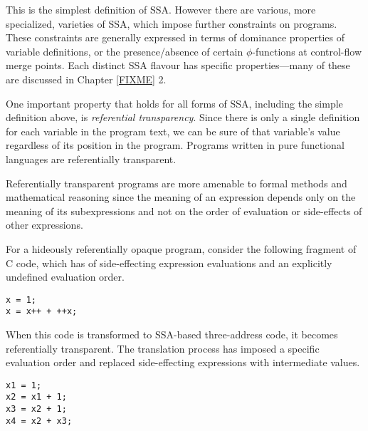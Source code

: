 This is the simplest definition of SSA. However
there are various, more specialized, varieties of SSA,
which impose further constraints on programs.
These constraints are generally expressed in terms
of dominance properties of variable definitions, or
the presence/absence of certain 
$\phi$-functions at control-flow merge points.
Each distinct SSA flavour has specific properties---many of
these are discussed in Chapter \ref{FIXME} 2.

One important property that holds for all forms of SSA,
including the simple definition above, is 
\emph{referential transparency}.
Since there is only a single definition for each variable
in the program text, we can be sure of that variable's value
regardless of its position in the program.
Programs written in pure functional languages
are referentially transparent.

Referentially transparent programs are more amenable to 
formal methods and mathematical reasoning since
the meaning of an expression depends only on the
meaning of its subexpressions
and not on the order of evaluation or
side-effects of other expressions.

For a hideously referentially opaque program, consider
the following fragment of C code, which has of side-effecting
expression evaluations and an explicitly undefined evaluation order. 
\begin{verbatim}
x = 1;
x = x++ + ++x;
\end{verbatim}

When this code is transformed to SSA-based three-address code,
it becomes referentially transparent. The translation process has
imposed a specific evaluation order and replaced side-effecting
expressions with intermediate values.
\begin{verbatim}
x1 = 1;
x2 = x1 + 1;
x3 = x2 + 1;
x4 = x2 + x3;
\end{verbatim}




